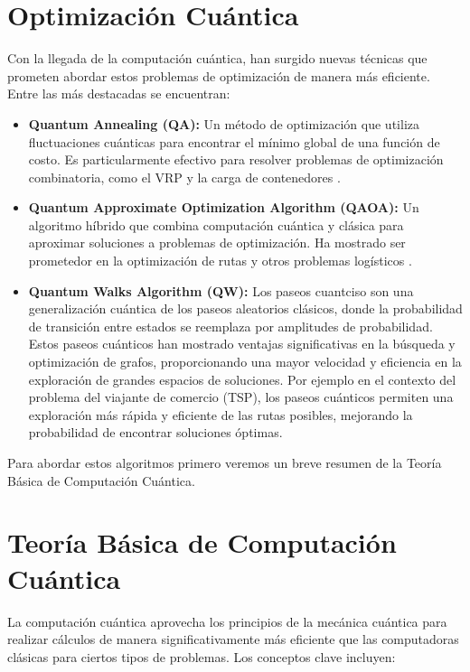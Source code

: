 \documentclass[11pt,a4paper,spanish]{book}
\begin{document}
\section{Optimización Cuántica}

Con la llegada de la computación cuántica, han surgido nuevas técnicas que prometen abordar estos problemas de optimización de manera más eficiente. Entre las más destacadas se encuentran:

\begin{itemize}
	\item \textbf{Quantum Annealing (QA):} Un método de optimización que utiliza fluctuaciones cuánticas para encontrar el mínimo global de una función de costo. Es particularmente efectivo para resolver problemas de optimización combinatoria, como el VRP y la carga de contenedores \cite{phillipson2024}.
	\item \textbf{Quantum Approximate Optimization Algorithm (QAOA):} Un algoritmo híbrido que combina computación cuántica y clásica para aproximar soluciones a problemas de optimización. Ha mostrado ser prometedor en la optimización de rutas y otros problemas logísticos \cite{farhiQuantum}.
    \item \textbf{Quantum Walks Algorithm (QW):} Los paseos cuantciso son una generalización cuántica de los paseos aleatorios clásicos, donde la probabilidad de transición entre estados se reemplaza por amplitudes de probabilidad. Estos paseos cuánticos han mostrado ventajas significativas en la búsqueda y optimización de grafos, proporcionando una mayor velocidad y eficiencia en la exploración de grandes espacios de soluciones. Por ejemplo en el contexto del problema del viajante de comercio (TSP), los paseos cuánticos permiten una exploración más rápida y eficiente de las rutas posibles, mejorando la probabilidad de encontrar soluciones óptimas. \cite{kempe2003}
 
\end{itemize}

Para abordar estos algoritmos primero veremos un breve resumen de la Teoría Básica de Computación Cuántica.


\section{Teoría Básica de Computación Cuántica}

La computación cuántica aprovecha los principios de la mecánica cuántica para realizar cálculos de manera significativamente más eficiente que las computadoras clásicas para ciertos tipos de problemas. Los conceptos clave incluyen:
\end{document}
